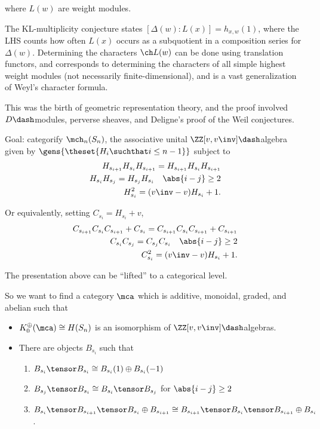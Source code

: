 where \(L(w)\) are weight modules.

The KL-multiplicity conjecture states
\([\Delta(w) : L(x)] = h_{x, w}(1)\), where the LHS counts how often
\(L(x)\) occurs as a subquotient in a composition series for
\(\Delta(w)\). Determining the characters \(\ch L(w)\) can be done using
translation functors, and corresponds to determining the characters of
all simple highest weight modules (not necessarily finite-dimensional),
and is a vast generalization of Weyl's character formula.

This was the birth of geometric representation theory, and the proof
involved \(D\dash\)modules, perverse sheaves, and Deligne's proof of the
Weil conjectures.

Goal: categorify \(\mch_n(S_n)\), the associative unital
\(\ZZ[v, v\inv]\dash\)algebra given by
\(\gens{\theset{H_i \suchthat i\leq n-1}}\) subject to \begin{align*}
H_{s_{i+1}}
H_{s_{i}}
H_{s_{i+1}} = 
H_{s_{i+1}}
H_{s_{i}}
H_{s_{i+1}} \\
H_{s_{i}}
H_{s_{j}}
=
H_{s_{j}}
H_{s_{i}} \quad \abs{i-j} \geq 2 \\
H_{s_{i}}^2 = (v\inv - v) H_{s_i} + 1
.\end{align*}

Or equivalently, setting \(C_{s_i} = H_{s_i} + v\), \begin{align*}
C_{s_{i+1}}
C_{s_{i}}
C_{s_{i+1}}  + C_{s_i} = 
C_{s_{i+1}}
C_{s_{i}}
C_{s_{i+1}} + C_{s_{i+1}} \\
C_{s_{i}}
C_{s_{j}}
=
C_{s_{j}}
C_{s_{i}} \quad \abs{i-j} \geq 2 \\
C_{s_{i}}^2 = (v\inv - v) H_{s_i} + 1
.\end{align*}

\begin{description}
\tightlist
\item[Remark]
The presentation above can be ``lifted'' to a categorical level.
\end{description}

So we want to find a category \(\mca\) which is additive, monoidal,
graded, and abelian such that

\begin{itemize}
\item
  \(K_0^\oplus(\mca) \cong H(S_n)\) is an isomorphism of
  \(\ZZ[v, v\inv]\dash\)algebras.
\item
  There are objects \(B_{s_i}\) such that

  \begin{enumerate}
  \def\labelenumi{\arabic{enumi}.}
  \tightlist
  \item
    \(B_{s_i} \tensor B_{s_i} \cong B_{s_i}(1) \oplus B_{s_i}(-1)\)
  \item
    \(B_{s_j} \tensor B_{s_i} \cong B_{s_i} \tensor B_{s_j}\) for
    \(\abs{i-j} \geq 2\)
  \item
    \(B_{s_i} \tensor B_{s_{i+1}} \tensor B_{s_i} \oplus B_{s_{i+1}} \cong B_{s_{i+1}} \tensor B_{s_{i}} \tensor B_{s_{i+1}} \oplus B_{s_{i}}\).
  \end{enumerate}
\end{itemize}

